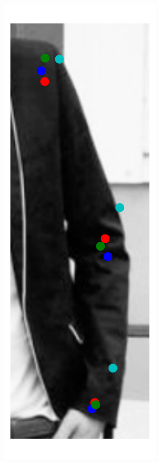 \begin{figure}[t!]
\begin{subfigure}[b]{0.05\textwidth}
    \end{subfigure}
    \hfill
    \begin{subfigure}[b]{0.05\textwidth}
            \includegraphics[width=\textwidth]{resources/Fig_Variance/image_4}

\end{subfigure}
\end{figure}
